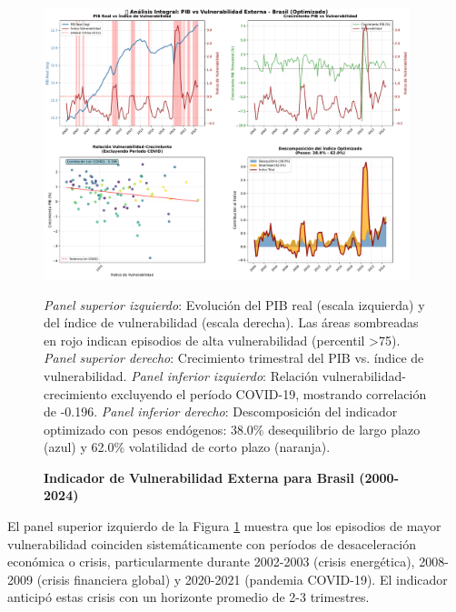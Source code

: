 \documentclass[3p,11pt]{elsarticle}
\begin{document}
\begin{figure}[htbp]
    \centering
    
    \caption[Indicador de Vulnerabilidad Externa - Brasil]{
        \textbf{Indicador de Vulnerabilidad Externa para Brasil (2000-2024)}
    }
    
    \vspace{0.5cm}
    
    \includegraphics[width=0.95\textwidth]{../../notebooks/figures/vulnerability_analysis.pdf}
    
    \vspace{0.3cm}
    
    \parbox{0.95\textwidth}{
        \small
        \textit{Panel superior izquierdo}: Evolución del PIB real (escala izquierda) 
        y del índice de vulnerabilidad (escala derecha). Las áreas sombreadas en rojo 
        indican episodios de alta vulnerabilidad (percentil >75). 
        \textit{Panel superior derecho}: Crecimiento trimestral del PIB vs. índice de vulnerabilidad. 
        \textit{Panel inferior izquierdo}: Relación vulnerabilidad-crecimiento excluyendo 
        el período COVID-19, mostrando correlación de -0.196. 
        \textit{Panel inferior derecho}: Descomposición del indicador optimizado con 
        pesos endógenos: 38.0\% desequilibrio de largo plazo (azul) y 62.0\% volatilidad 
        de corto plazo (naranja).
    }
    
    \label{fig:vulnerability_analysis}
\end{figure}

El panel superior izquierdo de la Figura \ref{fig:vulnerability_analysis} muestra que los 
episodios de mayor vulnerabilidad coinciden sistemáticamente con períodos de desaceleración 
económica o crisis, particularmente durante 2002-2003 (crisis energética), 2008-2009 
(crisis financiera global) y 2020-2021 (pandemia COVID-19). El indicador anticipó estas 
crisis con un horizonte promedio de 2-3 trimestres.
\end{document}
